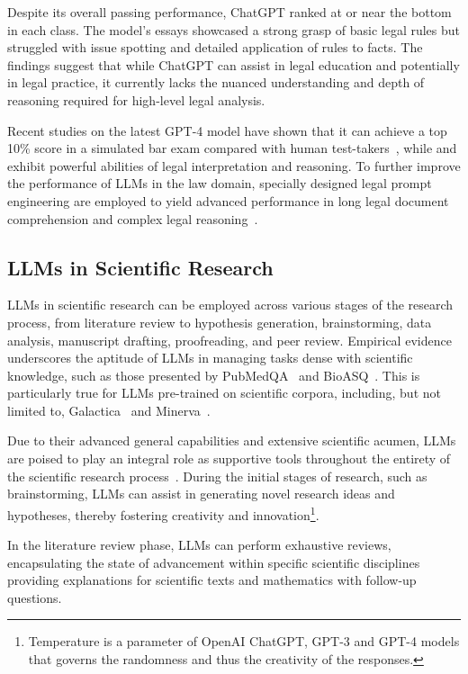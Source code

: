 Despite its overall passing performance, ChatGPT ranked at or near the bottom in each class.
The model's essays showcased a strong grasp of basic legal rules but struggled with issue spotting and detailed application of rules to facts.
The findings suggest that while ChatGPT can assist in legal education and potentially in legal practice, it currently lacks the nuanced understanding and depth of reasoning required for high-level legal analysis.

Recent studies on the latest GPT-4 model have shown that it can achieve a top 10\% score in a simulated bar exam compared with human test-takers~\cite{openai2024gpt4}, while \textcite{nay2022lawinformscode} and exhibit powerful abilities of legal interpretation and reasoning.
To further improve the performance of LLMs in the law domain, specially designed legal prompt engineering are employed to yield advanced performance in long legal document comprehension and complex legal reasoning~\cite{survey}.


\subsection{LLMs in Scientific Research}
\label{subsec:llms-in-scientific-research}

LLMs in scientific research can be employed across various stages of the research process, from literature review to hypothesis generation, brainstorming, data analysis, manuscript drafting, proofreading, and peer review.
Empirical evidence underscores the aptitude of LLMs in managing tasks dense with scientific knowledge, such as those presented by PubMedQA~\cite{jin2019pubmedqa} and BioASQ~\cite{krithara2022bioasq}.
This is particularly true for LLMs pre-trained on scientific corpora, including, but not limited to, Galactica~\cite{taylor2022galactica} and Minerva~\cite{lewkowycz2022minerva}.

Due to their advanced general capabilities and extensive scientific acumen, LLMs are poised to play an integral role as supportive tools throughout the entirety of the scientific research process~\cite{zhang2023smallstep}.
During the initial stages of research, such as brainstorming, LLMs can assist in generating novel research ideas and hypotheses, thereby fostering creativity and innovation\footnote{Temperature is a parameter of OpenAI ChatGPT, GPT-3 and GPT-4 models that governs the randomness and thus the creativity of the responses.}.

In the literature review phase, LLMs can perform exhaustive reviews, encapsulating the state of advancement within specific scientific disciplines~\cite{haman2023usingchatgpt, aydin2022openaichatgpt} providing explanations for scientific texts and mathematics with follow-up questions.

